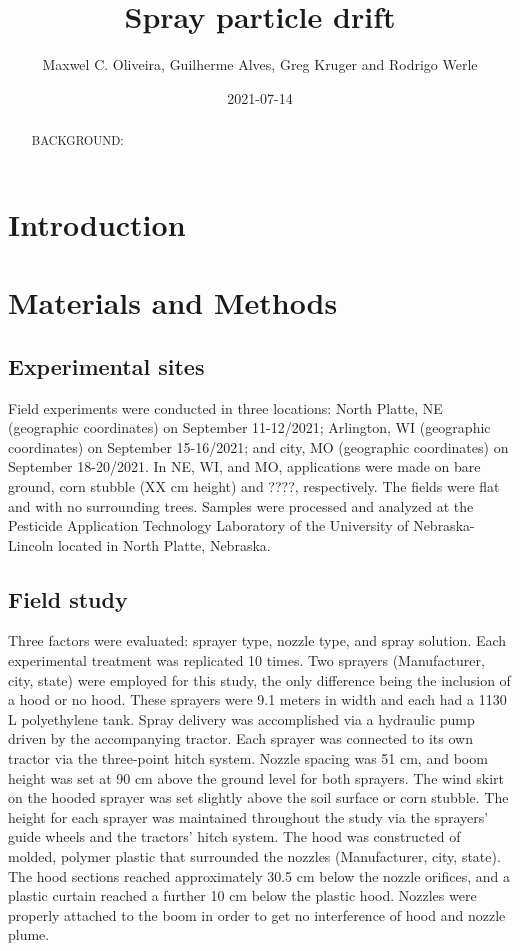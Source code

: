 \documentclass[
  12pt,
  a4paper,
]{article}
\title{Spray particle drift}
\author{Maxwel C. Oliveira, Guilherme Alves, Greg Kruger and Rodrigo
Werle}
\date{2021-07-14}
\begin{document}
\maketitle
\begin{abstract}
BACKGROUND:
\end{abstract}

\hypertarget{introduction}{%
\section{Introduction}\label{introduction}}

\hypertarget{materials-and-methods}{%
\section{Materials and Methods}\label{materials-and-methods}}

\hypertarget{experimental-sites}{%
\subsection{Experimental sites}\label{experimental-sites}}

Field experiments were conducted in three locations: North Platte, NE
(geographic coordinates) on September 11-12/2021; Arlington, WI
(geographic coordinates) on September 15-16/2021; and city, MO
(geographic coordinates) on September 18-20/2021. In NE, WI, and MO,
applications were made on bare ground, corn stubble (XX cm height) and
????, respectively. The fields were flat and with no surrounding trees.
Samples were processed and analyzed at the Pesticide Application
Technology Laboratory of the University of Nebraska-Lincoln located in
North Platte, Nebraska.

\hypertarget{field-study}{%
\subsection{Field study}\label{field-study}}

Three factors were evaluated: sprayer type, nozzle type, and spray
solution. Each experimental treatment was replicated 10 times. Two
sprayers (Manufacturer, city, state) were employed for this study, the
only difference being the inclusion of a hood or no hood. These sprayers
were 9.1 meters in width and each had a 1130 L polyethylene tank. Spray
delivery was accomplished via a hydraulic pump driven by the
accompanying tractor. Each sprayer was connected to its own tractor via
the three-point hitch system. Nozzle spacing was 51 cm, and boom height
was set at 90 cm above the ground level for both sprayers. The wind
skirt on the hooded sprayer was set slightly above the soil surface or
corn stubble. The height for each sprayer was maintained throughout the
study via the sprayers' guide wheels and the tractors' hitch system. The
hood was constructed of molded, polymer plastic that surrounded the
nozzles (Manufacturer, city, state). The hood sections reached
approximately 30.5 cm below the nozzle orifices, and a plastic curtain
reached a further 10 cm below the plastic hood. Nozzles were properly
attached to the boom in order to get no interference of hood and nozzle
plume.
\end{document}

